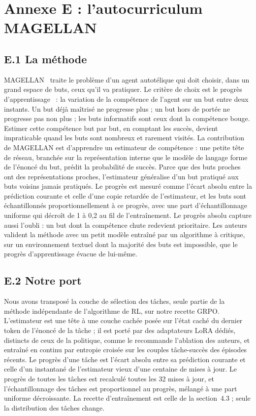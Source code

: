 \documentclass[11pt,a4paper]{article}
\begin{document}
\section{Annexe E : l'autocurriculum MAGELLAN}
\label{annexe:magellan}

\subsection*{E.1 La méthode}
MAGELLAN~\cite{gaven2025magellan} traite le problème d'un agent autotélique qui doit choisir, dans un grand espace de buts, ceux qu'il va pratiquer. Le critère de choix est le progrès d'apprentissage~\cite{graves2017automated} : la variation de la compétence de l'agent sur un but entre deux instants. Un but déjà maîtrisé ne progresse plus ; un but hors de portée ne progresse pas non plus ; les buts informatifs sont ceux dont la compétence bouge. Estimer cette compétence but par but, en comptant les succès, devient impraticable quand les buts sont nombreux et rarement visités. La contribution de MAGELLAN est d'apprendre un estimateur de compétence : une petite tête de réseau, branchée sur la représentation interne que le modèle de langage forme de l'énoncé du but, prédit la probabilité de succès. Parce que des buts proches ont des représentations proches, l'estimateur généralise d'un but pratiqué aux buts voisins jamais pratiqués. Le progrès est mesuré comme l'écart absolu entre la prédiction courante et celle d'une copie retardée de l'estimateur, et les buts sont échantillonnés proportionnellement à ce progrès, avec une part d'échantillonnage uniforme qui décroît de 1 à 0{,}2 au fil de l'entraînement. Le progrès absolu capture aussi l'oubli : un but dont la compétence chute redevient prioritaire. Les auteurs valident la méthode avec un petit modèle entraîné par un algorithme à critique, sur un environnement textuel dont la majorité des buts est impossible, que le progrès d'apprentissage évacue de lui-même.

\subsection*{E.2 Notre port}
Nous avons transposé la couche de sélection des tâches, seule partie de la méthode indépendante de l'algorithme de RL, sur notre recette GRPO. L'estimateur est une tête à une couche cachée posée sur l'état caché du dernier token de l'énoncé de la tâche ; il est porté par des adaptateurs LoRA dédiés, distincts de ceux de la politique, comme le recommande l'ablation des auteurs, et entraîné en continu par entropie croisée sur les couples tâche-succès des épisodes récents. Le progrès d'une tâche est l'écart absolu entre sa prédiction courante et celle d'un instantané de l'estimateur vieux d'une centaine de mises à jour. Le progrès de toutes les tâches est recalculé toutes les 32 mises à jour, et l'échantillonnage des tâches est proportionnel au progrès, mélangé à une part uniforme décroissante. La recette d'entraînement est celle de la section~4.3 ; seule la distribution des tâches change.
\end{document}
